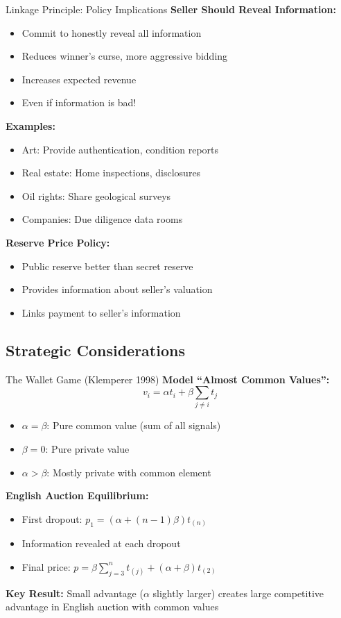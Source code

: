 \documentclass[xcolor={x11names}]{beamer}
\begin{document}
\begin{frame}{Linkage Principle: Policy Implications}
\textbf{Seller Should Reveal Information:}
\begin{itemize}
  \item Commit to honestly reveal all information
  \item Reduces winner's curse, more aggressive bidding
  \item Increases expected revenue
  \item Even if information is bad!
\end{itemize}


\textbf{Examples:}
\begin{itemize}
  \item Art: Provide authentication, condition reports
  \item Real estate: Home inspections, disclosures
  \item Oil rights: Share geological surveys
  \item Companies: Due diligence data rooms
\end{itemize}


\textbf{Reserve Price Policy:}
\begin{itemize}
  \item Public reserve better than secret reserve
  \item Provides information about seller's valuation
  \item Links payment to seller's information
\end{itemize}
\end{frame}

\subsection{Strategic Considerations}

\begin{frame}{The Wallet Game (Klemperer 1998)}
\textbf{Model ``Almost Common Values'':}
$$v_i = \alpha t_i + \beta \sum_{j \neq i} t_j$$

\begin{itemize}
  \item $\alpha = \beta$: Pure common value (sum of all signals)
  \item $\beta = 0$: Pure private value
  \item $\alpha > \beta$: Mostly private with common element
\end{itemize}


\textbf{English Auction Equilibrium:}
\begin{itemize}
  \item First dropout: $p_1 = (\alpha + (n-1)\beta)t_{(n)}$
  \item Information revealed at each dropout
  \item Final price: $p = \beta\sum_{j=3}^n t_{(j)} + (\alpha + \beta)t_{(2)}$
\end{itemize}

\textbf{Key Result:}
Small advantage ($\alpha$ slightly larger) creates large competitive advantage in English auction with common values
\end{frame}
\end{document}
